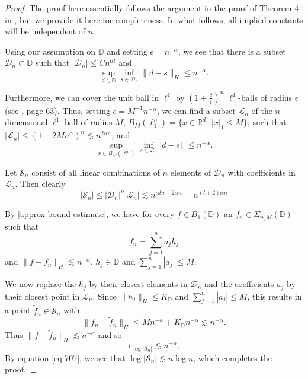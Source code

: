 \begin{proof}
 The proof here essentially follows the argument in the proof of Theorem 4 in \cite{makovoz1996random}, but we provide it here for completeness. In what follows, all implied constants will be independent of $n$.
 
 Using our assumption on $\mathbb{D}$ and setting $\epsilon = n^{-\alpha}$, we see that there is a subset $\mathcal{D}_n\subset \mathbb{D}$ such that $|\mathcal{D}_n| \leq Cn^{\alpha l}$ and
 \begin{equation}
  \sup_{d\in \mathbb{D}} \inf_{s\in \mathcal{D}_n} \|d - s\|_H \leq n^{-\alpha}.
 \end{equation}
 
 Furthermore, we can cover the unit ball in $\ell^1$ by $(1+\frac{2}{\epsilon})^n$ $\ell^1$-balls of radius $\epsilon$ (see \cite{pisier1999volume}, page $63$). Thus, setting $\epsilon = M^{-1}n^{-\alpha}$, we can find a subset $\mathcal{L}_n$ of the $n$-dimensional $\ell^1$-ball of radius $M$, $B_M(\ell_1^n) = \{x\in \mathbb{R}^d:~|x|_1\leq M\}$, such that $|
 \mathcal{L}_n| \leq (1 + 2Mn^\alpha)^n \lesssim n^{2\alpha n}$, and
 \begin{equation}
  \sup_{x\in B_M(\ell_1^n)} \inf_{s\in \mathcal{L}_n} |d - s|_1 \leq n^{-\alpha}.
 \end{equation}

 Let $\mathcal{S}_n$ consist of all linear combinations of $n$ elements of $\mathcal{D}_{n}$ with coefficients in $\mathcal{L}_{n}$. Then clearly 
 \begin{equation}\label{eq-707}
 |\mathcal{S}_n| \leq |\mathcal{D}_{n}|^n|\mathcal{L}_{n}| \lesssim n^{\alpha ln + 2\alpha n} = n^{(l + 2)\alpha n}
 \end{equation}
 
 By \eqref{approx-bound-estimate}, we have for every $f\in B_1(\mathbb{D})$ an $f_n\in \Sigma_{n,M}(\mathbb{D})$ such that
 \begin{equation}
  f_n = \sum_{j=1}^n a_jh_j
 \end{equation}
 and $\|f - f_n\|_H \lesssim n^{-\alpha}$, $h_j\in \mathbb{D}$ and $\sum_{j=1}^n|a_j| \leq M$. 
 
 We now replace the $h_j$ by their closest elements in $\mathcal{D}_{n}$ and the coefficients $a_j$ by their closest point in $\mathcal{L}_{n}$. Since $\|h_j\|_H\leq K_\mathbb{D}$ and $\sum_{j=1}^n|a_j| \leq M$, this results in a point $\tilde{f}_n\in \mathcal{S}_n$ with 
 $$\|f_n - \tilde{f}_n\|_H \leq Mn^{-\alpha} + K_\mathbb{D}n^{-\alpha} \lesssim n^{-\alpha}.$$ Thus $\|f - \tilde{f}_n\|_H\lesssim n^{-\alpha}$ and so
 \begin{equation}
  \epsilon_{\log{|\mathcal{S}_n|}} \lesssim n^{-\alpha}.
 \end{equation}
 By equation \eqref{eq-707}, we see that $\log{|\mathcal{S}_n|} \lesssim n\log{n}$, which completes the proof.
\end{proof}

